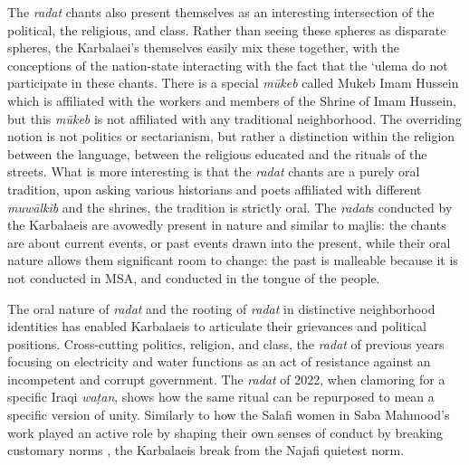 The \emph{radat} chants also present themselves as an interesting intersection of the political, the religious, and class. Rather than seeing these spheres as disparate spheres, the Karbalaei’s themselves easily mix these together, with the conceptions of the nation-state interacting with the fact that the ‘ulema do not participate in these chants. There is a special \emph{mūkeb} called Mukeb Imam Hussein which is affiliated with the workers and members of the Shrine of Imam Hussein, but this \emph{mūkeb} is not affiliated with any traditional neighborhood. The overriding notion is not politics or sectarianism, but rather a distinction within the religion between the language, between the religious educated and the rituals of the streets. What is more interesting is that the \emph{radat} chants are a purely oral tradition, upon asking various historians and poets affiliated with different \emph{muwālkib} and the shrines, the tradition is strictly oral. The \emph{radat}s conducted by the Karbalaeis are avowedly present in nature and similar to majlis: the chants are about current events, or past events drawn into the present, while their oral nature allows them significant room to change: the past is malleable because it is not conducted in MSA, and conducted in the tongue of the people. 

The oral nature of \emph{radat} and the rooting of \emph{radat} in distinctive neighborhood identities has enabled Karbalaeis to articulate their grievances and political positions. Cross-cutting politics, religion, and class, the \emph{radat} of previous years focusing on electricity and water functions as an act of resistance against an incompetent and corrupt government. The \emph{radat} of 2022, when clamoring for a specific Iraqi \emph{waṭan}, shows how the same ritual can be repurposed to mean a specific version of unity. Similarly to how the Salafi women in Saba Mahmood's work played an active role by shaping their own senses of conduct by breaking customary norms \cite[87]{mahmood_politics_2005}, the Karbalaeis break from the Najafi quietest norm. 


